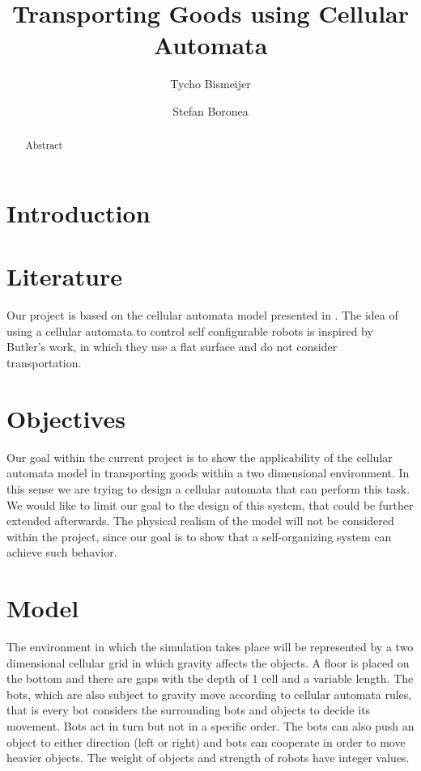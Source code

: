 \documentclass[runningheads]{llncs}
\title{Transporting Goods using Cellular Automata}
\author{Tycho Bismeijer\inst{1} \and Stefan Boronea\inst{1}}
\institute{Faculty of Exact Sciences, Vrije Universiteit Amsterdam}
\date{}
\begin{document}
\maketitle

\begin{abstract}
Abstract
\end{abstract}

\section{Introduction}

\section{Literature}
Our project is based on the cellular automata model presented in \cite{1013457}. The idea of using a cellular automata to control self configurable robots is inspired by Butler's work, in which they use a flat surface and do not consider transportation.

\section{Objectives}
Our goal within the current project is to show the applicability of the cellular automata model in transporting goods within a two dimensional environment. In this sense we are trying to design a cellular automata that can perform this task. We would like to limit our goal to the design of this system, that could be further extended afterwards. The physical realism of the model will not be considered within the project, since our goal is to show that a self-organizing system can achieve such behavior.

\section{Model}
The environment in which the simulation takes place will be represented by a two dimensional cellular grid in which gravity affects the objects. A floor is placed on the bottom and there are gaps with the depth of 1 cell and a variable length. The bots, which are also subject to gravity move according to cellular automata rules, that is every bot considers the surrounding bots and objects to decide its movement. Bots act in turn but not in a specific order. The bots can also push an object to either direction (left or right) and bots can cooperate in order to move heavier objects. The weight of objects and strength of robots have integer values.
\end{document}
